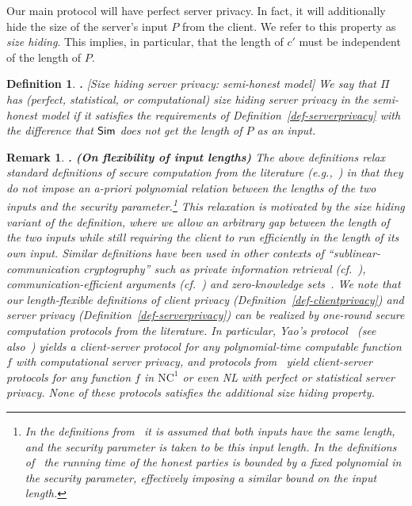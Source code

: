 \documentclass{article}
\newcommand{\ynote}[1]{}
\newcommand{\full}[1]{#1}
\newcommand{\nc}[1]{{\mathrm{NC}^{#1}}}
\newcommand{\NCone}{{\nc{1}}}
\renewcommand{\sim}{{\sf Sim}}
\newtheorem{REMARK}{Remark}[section]
\newenvironment{remark}{\begin{REMARK} \hspace{-.85em} {\bf .} \rm}%
	{\end{REMARK}}
\newtheorem{DEFINITION}{Definition}[section]
\newenvironment{definition}{\begin{DEFINITION} \hspace{-.85em} {\bf .} \rm}%
	{\end{DEFINITION}}
\begin{document}
Our main protocol will have perfect server privacy. In fact, it will
additionally hide the size of the server's input $P$ from the
client.  We refer to this property as {\em size hiding}. This
implies, in particular, that the length of $c'$ must be independent
of the length of $P$.

\begin{definition}[Size hiding server privacy: semi-honest model]
\label{def-sizehiding} We say that $\Pi$ has (perfect, statistical,
or computational) {\em size hiding server privacy} in the
semi-honest model if it satisfies the requirements of
Definition~\ref{def-serverprivacy} with the difference that
$\sim$ does not get the length of $P$ as an input.
\end{definition}

\full{
\begin{remark}{\bf (On flexibility of input lengths)}
The above definitions relax standard definitions of secure
computation from the literature (e.g.,~\cite{canetti01,Goldbook}) in that
they do not impose an a-priori polynomial relation between the
lengths of the two inputs and the security parameter.\footnote{In
the definitions from~\cite{Goldbook} it is assumed that both inputs
have the same length, and the security parameter is taken to be
this input length. In the definitions of~\cite{canetti01} the running
time of the honest parties is bounded by a fixed polynomial in the
security parameter, effectively imposing a similar bound on the
input length.} This relaxation is motivated by the size hiding
variant of the definition, where we allow an arbitrary gap between
the length of the two inputs while still requiring the client to
run efficiently in the length of its own input. Similar definitions
have been used in other contexts of ``sublinear-communication
cryptography'' such as private information retrieval
(cf.~\cite{L04}), communication-efficient arguments (cf.~\cite{BG})
and zero-knowledge sets~\cite{MRK}.\ynote{should check how similar
these definitions are...} We note that our length-flexible
definitions of client privacy (Definition~\ref{def-clientprivacy})
and server privacy (Definition~\ref{def-serverprivacy}) can be
realized by one-round secure computation protocols from the
literature. In particular, Yao's protocol~\cite{yao86} (see
also~\cite{FKN94,L04}) yields a client-server protocol for any
polynomial-time computable function $f$ with computational server
privacy, and protocols from~\cite{syy99,K,FKN94,ik00,beaver00,Kol}
yield client-server protocols for any function $f$ in $\NCone$ or
even NL with perfect or statistical server privacy. None of these
protocols satisfies the additional size hiding property.
\end{remark}
}
\end{document}
